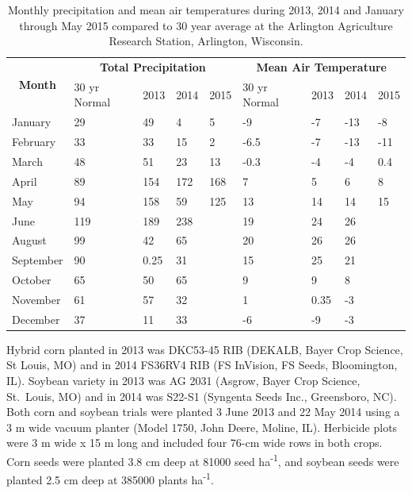 \documentclass[agriculture,article,submit,moreauthors,pdftex]{mdpi}
\begin{document}
\begin{table}[H]
\centering
\caption{Monthly precipitation and mean air temperatures during 2013, 2014 and January through May 2015 compared to 30 year average at the Arlington Agriculture Research Station, Arlington, Wisconsin.}
\label{tab:my-table}
\begin{tabular}{@{}lllllllll@{}}
\toprule
\multicolumn{1}{c}{\multirow{2}{*}{\textbf{Month}}} & \multicolumn{4}{c}{\textbf{Total Precipitation}}                                                                    & \multicolumn{4}{c}{\textbf{Mean Air Temperature}}                                               \\ \cmidrule{2-9} 
& 30 yr Normal & 2013 & 2014 & 2015 & 30 yr Normal & 2013 & 2014 & 2015 \\ \cmidrule{1-9} 
January & 29 & 49 & 4 & 5 & -9 & -7 & -13 & -8\\ 
February & 33 & 33 & 15 & 2 & -6.5 & -7 & -13 &-11 \\ 
March & 48 & 51 & 23 & 13 & -0.3 & -4 & -4& 0.4 \\ 
April & 89 & 154 & 172 & 168 & 7 & 5 & 6& 8 \\ 
May & 94 & 158 & 59 & 125 & 13 & 14 & 14 &15 \\ 
June & 119 & 189 & 238 & & 19 & 24 & 26 &\\ 
August & 99 & 42 & 65 & & 20 & 26 & 26 &\\ 
September & 90 & 0.25 & 31 & & 15 & 25 & 21 &\\ 
October & 65 & 50 & 65 & & 9 & 9 & 8 &\\ 
November & 61 & 57 & 32 & & 1 & 0.35 & -3 &\\ 
December & 37 & 11 & 33 & & -6 & -9 & -3 &\\ 
\bottomrule 
\end{tabular}
\end{table}

Hybrid corn planted in 2013 was DKC53-45 RIB (DEKALB, Bayer Crop
Science, St Louis, MO) and in 2014 FS36RV4 RIB (FS InVision, FS Seeds,
Bloomington, IL). Soybean variety in 2013 was AG 2031 (Asgrow, Bayer
Crop Science, St.~Louis, MO) and in 2014 was S22-S1 (Syngenta Seeds
Inc., Greensboro, NC). Both corn and soybean trials were planted 3 June
2013 and 22 May 2014 using a 3 m wide vacuum planter (Model 1750, John
Deere, Moline, IL). Herbicide plots were 3 m wide x 15 m long and
included four 76-cm wide rows in both crops. Corn seeds were planted 3.8
cm deep at 81000 seed ha\textsuperscript{-1}, and soybean seeds were
planted 2.5 cm deep at 385000 plants ha\textsuperscript{-1}.
\end{document}
